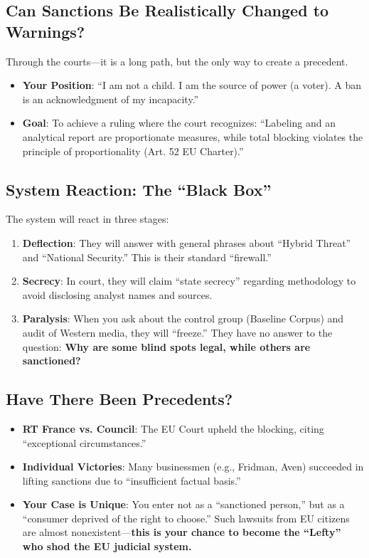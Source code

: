 \documentclass[11pt,a4paper]{article}
\theoremstyle{definition}
\theoremstyle{remark}
\begin{document}
\subsection{Can Sanctions Be Realistically Changed to Warnings?}

Through the courts—it is a long path, but the only way to create a precedent.

\begin{itemize}
\item \textbf{Your Position}: ``I am not a child. I am the source of power (a voter). A ban is an acknowledgment of my incapacity.''

\item \textbf{Goal}: To achieve a ruling where the court recognizes: ``Labeling and an analytical report are proportionate measures, while total blocking violates the principle of proportionality (Art. 52 EU Charter).''
\end{itemize}

\subsection{System Reaction: The ``Black Box''}

The system will react in three stages:

\begin{enumerate}
\item \textbf{Deflection}: They will answer with general phrases about ``Hybrid Threat'' and ``National Security.'' This is their standard ``firewall.''

\item \textbf{Secrecy}: In court, they will claim ``state secrecy'' regarding methodology to avoid disclosing analyst names and sources.

\item \textbf{Paralysis}: When you ask about the control group (Baseline Corpus) and audit of Western media, they will ``freeze.'' They have no answer to the question: \textbf{Why are some blind spots legal, while others are sanctioned?}
\end{enumerate}

\subsection{Have There Been Precedents?}

\begin{itemize}
\item \textbf{RT France vs. Council}: The EU Court upheld the blocking, citing ``exceptional circumstances.''

\item \textbf{Individual Victories}: Many businessmen (e.g., Fridman, Aven) succeeded in lifting sanctions due to ``insufficient factual basis.''

\item \textbf{Your Case is Unique}: You enter not as a ``sanctioned person,'' but as a ``consumer deprived of the right to choose.'' Such lawsuits from EU citizens are almost nonexistent—\textbf{this is your chance to become the ``Lefty'' who shod the EU judicial system.}
\end{itemize}
\end{document}
